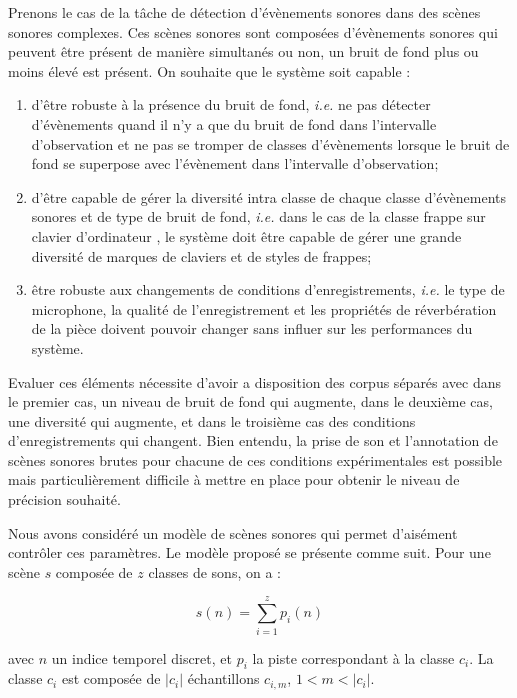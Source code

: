 Prenons le cas de la tâche de détection d'évènements sonores dans des scènes sonores complexes. Ces scènes sonores sont composées d'évènements sonores qui peuvent être présent de manière simultanés ou non, un bruit de fond plus ou moins élevé est présent. On souhaite que le système soit capable :
\begin{enumerate}
  \item d'être robuste à la présence du bruit de fond, \textit{i.e.} ne pas détecter d'évènements quand il n'y a que du bruit de fond dans l'intervalle d'observation et ne pas se tromper de classes d'évènements lorsque le bruit de fond se superpose avec l'évènement  dans l'intervalle d'observation;
  \item d'être capable de gérer la diversité intra classe de chaque classe d'évènements sonores et de type de bruit de fond,  \textit{i.e.} dans le cas de la classe \og frappe sur clavier d'ordinateur \fg, le système doit être capable de gérer une grande diversité de marques de claviers et de styles de frappes;
  \item être robuste aux changements de conditions d'enregistrements,  \textit{i.e.} le type de microphone, la qualité de l'enregistrement et les propriétés de réverbération de la pièce doivent pouvoir changer sans influer sur les performances du système.
\end{enumerate}

Evaluer ces éléments nécessite d'avoir a disposition des corpus séparés avec dans le premier cas, un niveau de bruit de fond qui augmente, dans le deuxième cas, une diversité qui augmente, et dans le troisième cas des conditions d'enregistrements qui changent. Bien entendu, la prise de son et l'annotation de scènes sonores brutes pour chacune de ces conditions expérimentales est possible mais particulièrement difficile à mettre en place pour obtenir le niveau de précision souhaité.

Nous avons considéré un modèle de scènes sonores qui permet d'aisément contrôler ces paramètres. Le modèle proposé se présente comme suit. Pour une scène $s$ composée de $z$ classes de sons, on a :

\begin{equation}
s(n)=\sum_{i=1}^{z}p_i(n)
\end{equation}

avec $n$ un indice temporel discret, et $p_i$ la piste correspondant à la classe $c_i$. La classe $c_i$ est composée de $\vert c_i\vert$ échantillons $c_{i,m}$, $1<m<\vert c_i\vert$.

